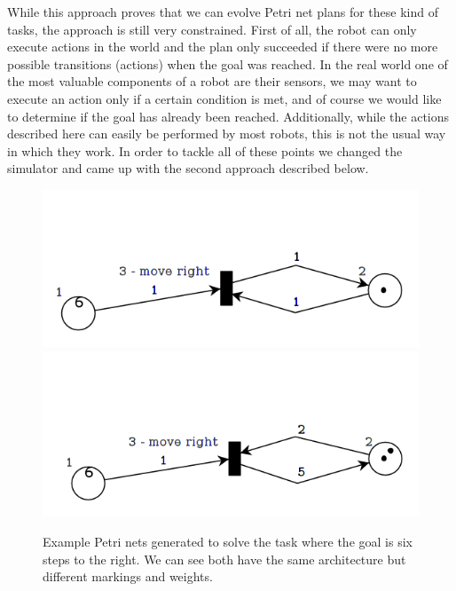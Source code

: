 \documentclass[12pt,a4paper,twocolumn]{article}
\begin{document}
While this approach proves that we can evolve Petri net plans for these kind of tasks, the approach is still very constrained. First of all, the robot can only execute actions in the world and the plan only succeeded if there were no more possible transitions (actions) when the goal was reached. In the real world one of the most valuable components of a robot are their sensors, we may want to execute an action only if a certain condition is met, and of course we would like to determine if the goal has already been reached. Additionally, while the actions described here can easily be performed by most robots, this is not the usual way in which they work. In order to tackle all of these points we changed the simulator and came up with the second approach described below. 



\begin{figure} [h]
\centering
\includegraphics[scale=0.3, trim = 0 5mm 0 30mm, clip = true]{PetriNet_1_1}
\includegraphics[scale=0.3, trim = 0 5mm 0 35mm, clip = true]{PetriNet_1_2}
\caption{Example Petri nets generated to solve the task where the goal is six steps to the right. We can see both have the same architecture but different markings and weights.}
\label{fig:pn1_1}
\end{figure}
\end{document}
